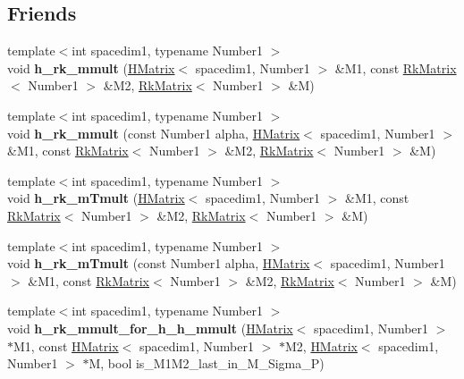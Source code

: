 \subsection*{Friends}
\begin{DoxyCompactItemize}
\item 
\mbox{\label{classRkMatrix_a1b5b4592067610eec18b830482897243}} 
{\footnotesize template$<$int spacedim1, typename Number1 $>$ }\\void {\bfseries h\+\_\+rk\+\_\+mmult} (\hyperlink{classHMatrix}{H\+Matrix}$<$ spacedim1, Number1 $>$ \&M1, const \hyperlink{classRkMatrix}{Rk\+Matrix}$<$ Number1 $>$ \&M2, \hyperlink{classRkMatrix}{Rk\+Matrix}$<$ Number1 $>$ \&M)
\item 
\mbox{\label{classRkMatrix_af04c7cb6f2968253cf41b1d1a93760c7}} 
{\footnotesize template$<$int spacedim1, typename Number1 $>$ }\\void {\bfseries h\+\_\+rk\+\_\+mmult} (const Number1 alpha, \hyperlink{classHMatrix}{H\+Matrix}$<$ spacedim1, Number1 $>$ \&M1, const \hyperlink{classRkMatrix}{Rk\+Matrix}$<$ Number1 $>$ \&M2, \hyperlink{classRkMatrix}{Rk\+Matrix}$<$ Number1 $>$ \&M)
\item 
\mbox{\label{classRkMatrix_ad59530b8595d7716e02b405e35dbc561}} 
{\footnotesize template$<$int spacedim1, typename Number1 $>$ }\\void {\bfseries h\+\_\+rk\+\_\+m\+Tmult} (\hyperlink{classHMatrix}{H\+Matrix}$<$ spacedim1, Number1 $>$ \&M1, const \hyperlink{classRkMatrix}{Rk\+Matrix}$<$ Number1 $>$ \&M2, \hyperlink{classRkMatrix}{Rk\+Matrix}$<$ Number1 $>$ \&M)
\item 
\mbox{\label{classRkMatrix_a8cf5a4058289ffe89a9f88379e643e53}} 
{\footnotesize template$<$int spacedim1, typename Number1 $>$ }\\void {\bfseries h\+\_\+rk\+\_\+m\+Tmult} (const Number1 alpha, \hyperlink{classHMatrix}{H\+Matrix}$<$ spacedim1, Number1 $>$ \&M1, const \hyperlink{classRkMatrix}{Rk\+Matrix}$<$ Number1 $>$ \&M2, \hyperlink{classRkMatrix}{Rk\+Matrix}$<$ Number1 $>$ \&M)
\item 
\mbox{\label{classRkMatrix_a614ba3b92b97d95cb3146db181611a34}} 
{\footnotesize template$<$int spacedim1, typename Number1 $>$ }\\void {\bfseries h\+\_\+rk\+\_\+mmult\+\_\+for\+\_\+h\+\_\+h\+\_\+mmult} (\hyperlink{classHMatrix}{H\+Matrix}$<$ spacedim1, Number1 $>$ $\ast$M1, const \hyperlink{classHMatrix}{H\+Matrix}$<$ spacedim1, Number1 $>$ $\ast$M2, \hyperlink{classHMatrix}{H\+Matrix}$<$ spacedim1, Number1 $>$ $\ast$M, bool is\+\_\+\+M1\+M2\+\_\+last\+\_\+in\+\_\+\+M\+\_\+\+Sigma\+\_\+P)

\end{DoxyCompactItemize}
